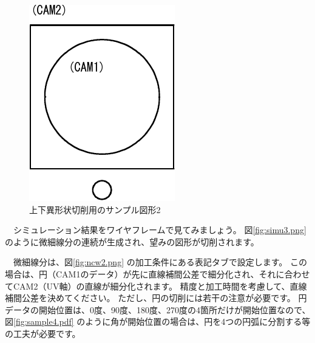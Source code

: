 \begin{figure}[H]
\centering
\includegraphics{No2/fig/sample3-crop.pdf}
\caption{上下異形状切削用のサンプル図形2}
\label{fig:sample3.pdf}
\end{figure}

　シミュレーション結果をワイヤフレームで見てみましょう。
図\ref{fig:simu3.png} のように微細線分の連続が生成され、望みの図形が切削されます。


　微細線分は、図\ref{fig:ncw2.png} の加工条件にある表記タブで設定します。
この場合は、円（CAM1のデータ）が先に直線補間公差で細分化され、それに合わせてCAM2（UV軸）の直線が細分化されます。
精度と加工時間を考慮して、直線補間公差を決めてください。
ただし、円の切削には若干の注意が必要です。
円データの開始位置は、0度、90度、180度、270度の4箇所だけが開始位置なので、図\ref{fig:sample4.pdf} のように角が開始位置の場合は、円を4つの円弧に分割する等の工夫が必要です。

